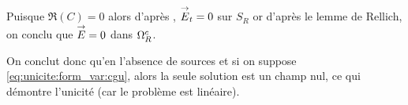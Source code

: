   Puisque \(\Re(C) = 0\) alors d'après \cite[Théorème~5.3.5]{nedelec_acoustic_2001}, \({\overset{\rightarrow}{E}}_t = 0\) sur \(S_R\) or d'après le lemme de Rellich, on conclu que \({\overset{\rightarrow}{E}} = 0\) dans \(\Omega^c_R\).

  On conclut donc qu'en l'absence de sources et si on suppose \eqref{eq:unicite:form_var:cgu}, alors la seule solution est un champ nul, ce qui démontre l'unicité (car le problème est linéaire).




